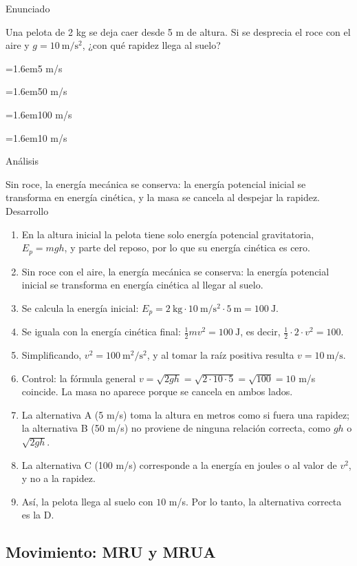\documentclass[10pt,a4paper,twocolumn]{article}
\newcommand{\alternativa}[2]{\par\noindent\hangindent=1.6em\hangafter=1\makebox[1.6em][l]{\tecla{#1}}#2\par}
\newcommand{\clave}[1]{\par\smallskip{\sffamily\footnotesize\color{esmeralda} Clave \teclaok{#1}}\par}
\begin{document}
\begin{ejemplo}
{\sffamily\footnotesize\color{zinc500} Enunciado}\par
Una pelota de 2 kg se deja caer desde 5 m de altura. Si se desprecia el roce con el aire y $g = 10\ \mathrm{m/s^2}$, ¿con qué rapidez llega al suelo?
\alternativa{A}{5 m/s}
\alternativa{B}{50 m/s}
\alternativa{C}{100 m/s}
\alternativa{D}{10 m/s}
\clave{D}
{\sffamily\footnotesize\color{zinc500} Análisis}\par Sin roce, la energía mecánica se conserva: la energía potencial inicial se transforma en energía cinética, y la masa se cancela al despejar la rapidez.
{\sffamily\footnotesize\color{zinc500} Desarrollo}
\begin{enumerate}
  \item En la altura inicial la pelota tiene solo energía potencial gravitatoria, $E_p = mgh$, y parte del reposo, por lo que su energía cinética es cero.
  \item Sin roce con el aire, la energía mecánica se conserva: la energía potencial inicial se transforma en energía cinética al llegar al suelo.
  \item Se calcula la energía inicial: $E_p = 2\ \mathrm{kg}\cdot 10\ \mathrm{m/s^2}\cdot 5\ \mathrm{m} = 100\ \mathrm{J}$.
  \item Se iguala con la energía cinética final: $\tfrac{1}{2}mv^2 = 100\ \mathrm{J}$, es decir, $\tfrac{1}{2}\cdot 2\cdot v^2 = 100$.
  \item Simplificando, $v^2 = 100\ \mathrm{m^2/s^2}$, y al tomar la raíz positiva resulta $v = 10\ \mathrm{m/s}$.
  \item Control: la fórmula general $v = \sqrt{2gh} = \sqrt{2\cdot 10\cdot 5} = \sqrt{100} = 10$ m/s coincide. La masa no aparece porque se cancela en ambos lados.
  \item La alternativa A (5 m/s) toma la altura en metros como si fuera una rapidez; la alternativa B (50 m/s) no proviene de ninguna relación correcta, como $gh$ o $\sqrt{2gh}$.
  \item La alternativa C (100 m/s) corresponde a la energía en joules o al valor de $v^2$, y no a la rapidez.
  \item Así, la pelota llega al suelo con $10$ m/s. Por lo tanto, la alternativa correcta es la D.
\end{enumerate}
\end{ejemplo}

\subsection{Movimiento: MRU y MRUA}
\end{document}
